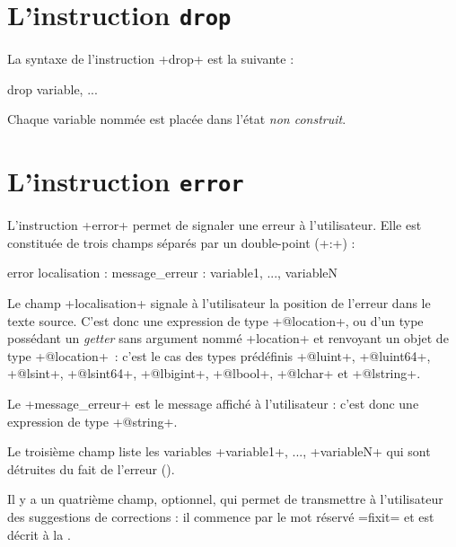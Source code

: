 \section{L'instruction \texttt{drop}}

La syntaxe de l'instruction \ggs+drop+ est la suivante :

\begin{galgasbox}
drop variable, ...
\end{galgasbox}

Chaque variable nommée est placée dans l'état \emph{non construit}.








\section{L'instruction \texttt{error}}

L'instruction \ggs+error+ permet de signaler une erreur à l'utilisateur. Elle est constituée de trois champs séparés par un double-point (\ggs+:+) :

\begin{galgasbox}
error localisation : message_erreur : variable1, ..., variableN
\end{galgasbox}



Le champ \ggs+localisation+ signale à l'utilisateur la position de l'erreur dans le texte source. C'est donc une expression de type \ggs+@location+, ou d'un type possédant un \emph{getter} sans argument nommé \ggs+location+ et renvoyant un objet de type \ggs+@location+~: c'est le cas des types prédéfinis \ggs+@luint+, \ggs+@luint64+, \ggs+@lsint+, \ggs+@lsint64+, \ggs+@lbigint+, \ggs+@lbool+, \ggs+@lchar+ et \ggs+@lstring+.

Le \ggs+message_erreur+ est le message affiché à l'utilisateur : c'est donc une expression de type \ggs+@string+.

Le troisième champ liste les variables \ggs+variable1+, ..., \ggs+variableN+ qui sont détruites du fait de l'erreur ().

Il y a un quatrième champ, optionnel, qui permet de transmettre à l'utilisateur des suggestions de corrections : il commence par le mot réservé \ggs=fixit= et est décrit à la .

